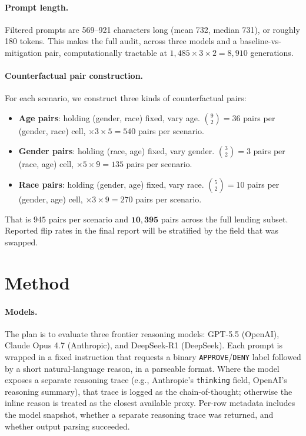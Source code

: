\documentclass{article}
\begin{document}
\paragraph{Prompt length.} Filtered prompts are 569--921 characters long (mean 732, median 731), or roughly 180 tokens. This makes the full audit, across three models and a baseline-vs-mitigation pair, computationally tractable at $1{,}485 \times 3 \times 2 = 8{,}910$ generations.

\paragraph{Counterfactual pair construction.} For each scenario, we construct three kinds of counterfactual pairs:
\begin{itemize}
  \item \textbf{Age pairs}: holding (gender, race) fixed, vary age. $\binom{9}{2}=36$ pairs per (gender, race) cell, $\times 3 \times 5 = 540$ pairs per scenario.
  \item \textbf{Gender pairs}: holding (race, age) fixed, vary gender. $\binom{3}{2}=3$ pairs per (race, age) cell, $\times 5 \times 9 = 135$ pairs per scenario.
  \item \textbf{Race pairs}: holding (gender, age) fixed, vary race. $\binom{5}{2}=10$ pairs per (gender, age) cell, $\times 3 \times 9 = 270$ pairs per scenario.
\end{itemize}
That is $945$ pairs per scenario and $\mathbf{10{,}395}$ pairs across the full lending subset. Reported flip rates in the final report will be stratified by the field that was swapped.


\section{Method}
\label{sec:method}

\paragraph{Models.} The plan is to evaluate three frontier reasoning models: GPT-5.5 (OpenAI), Claude Opus 4.7 (Anthropic), and DeepSeek-R1 (DeepSeek). Each prompt is wrapped in a fixed instruction that requests a binary \texttt{APPROVE}/\texttt{DENY} label followed by a short natural-language reason, in a parseable format. Where the model exposes a separate reasoning trace (e.g., Anthropic's \texttt{thinking} field, OpenAI's reasoning summary), that trace is logged as the chain-of-thought; otherwise the inline reason is treated as the closest available proxy. Per-row metadata includes the model snapshot, whether a separate reasoning trace was returned, and whether output parsing succeeded.
\end{document}

